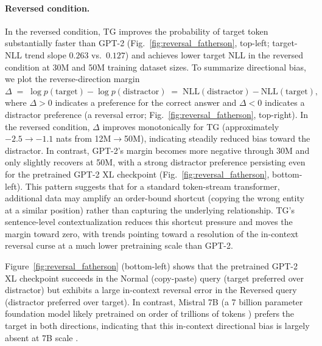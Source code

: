 \documentclass{article}
\begin{document}
\vspace{-0.1cm}

\paragraph{Reversed condition.}
In the reversed condition, TG improves the probability of target token substantially faster than GPT-2 (Fig.~\ref{fig:reversal_fatherson}, top-left; target-NLL trend slope $0.263$ vs.\ $0.127$) and achieves lower target NLL in the reversed condition at 30M and 50M training dataset sizes. To summarize directional bias, we plot the reverse-direction margin $\Delta \;=\; \log p(\text{target}) - \log p(\text{distractor})
\;=\; \mathrm{NLL}(\text{distractor}) - \mathrm{NLL}(\text{target}),
$
where $\Delta>0$ indicates a preference for the correct answer and $\Delta<0$ indicates a distractor preference (a reversal error; Fig.~\ref{fig:reversal_fatherson}, top-right). In the reversed condition, $\Delta$ improves monotonically for TG (approximately $-2.5\rightarrow -1.1$ nats from 12M$\rightarrow$50M), indicating steadily reduced bias toward the distractor.
In contrast, GPT-2’s margin becomes more negative through 30M and only slightly recovers at 50M, with a strong distractor preference persisting even for the pretrained GPT-2 XL checkpoint (Fig.~\ref{fig:reversal_fatherson}, bottom-left).
This pattern suggests that for a standard token-stream transformer, additional data may amplify an order-bound shortcut (copying the wrong entity at a similar position) rather than capturing the underlying relationship.
TG’s sentence-level contextualization reduces this shortcut pressure and moves the margin toward zero, with trends pointing toward a resolution of the in-context reversal curse at a much lower pretraining scale than GPT-2.

Figure~\ref{fig:reversal_fatherson} (bottom-left) shows that the pretrained GPT-2 XL checkpoint succeeds in the Normal (copy-paste) query (target preferred over distractor) but exhibits a large in-context reversal error in the Reversed query (distractor preferred over target).
In contrast, Mistral 7B (a 7 billion parameter foundation model likely pretrained on order of trillions of tokens \citep{deepseekv3}) prefers the target in both directions, indicating that this in-context directional bias is largely absent at 7B scale \citep{jiang2023mistral7b}.
\end{document}
